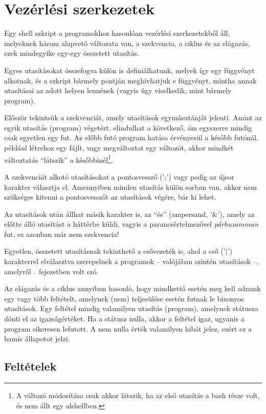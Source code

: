 \chapter{Vezérlési szerkezetek}%
\label{cha:vez-szerk}

Egy shell szkript a programokhoz hasonlóan vezérlési szerkezetekből áll,
melyeknek három alapvető változata van, a szekvencia, a ciklus és az
elágazás, ezek mindegyike egy-egy összetett utasítás.

Egyes utasításokat összefogva külön is definiálhatunk, melyek így egy
függvényt alkotnak, és a szkript bármely pontján meghívhatjuk e függvényt,
mintha annak utasításai az adott helyen lennének (vagyis úgy viselkedik, mint
bármely program).

Először tekintsük a szekvenciát, amely utasítások egymásutánját jelenti. Amint
az egyik utasítás (program) végetért, elindulhat a következő, ám egyszerre
mindig csak egyetlen egy fut. Az előbb futó program hatása érvényesül a később
futónál, például létrehoz egy fájlt, vagy megváltoztat egy változót, akkor
mindkét változtatás ``látszik'' a későbbinél\footnote{A változó módosítása csak
akkor látszik, ha az első utasítás a bash része volt, és nem állt egy
alshellben.}.

A szekvenciát alkotó utasításokat a pontosvessző (';') vagy pedig az újsor
karakter választja el. Amennyiben minden utasítás külön sorban van, akkor nem
szükséges kitenni a pontosvesszőt az utasítások végére, bár ki lehet.

Az utasítások után állhat másik karakter is, az ``és'' (ampersand, '\&'), amely
az előtte álló utasítást a háttérbe küldi, vagyis a parancsértelmezővel
\emph{párhuzamosan} fut, ez azonban már nem szekvencia!

Egyetlen, összetett  utasításnak tekinthető a csővezeték is, ahol a cső ('|')
karakterrel elválasztva szerepelnek a programok -- valójában szintén utasítások
--, amelyről .\ fejezetben volt szó.

Az elágazás és a ciklus annyiban hasonló, hogy mindkettő esetén meg kell adnunk
egy vagy több feltételt, amelynek (nem) teljesülése esetén futnak le bizonyos
utasítások. Egy feltétel mindig valamilyen utasítás (program), amelynek státusza
dönti el az igazságértéket. Ha a státusz nulla, akkor a feltétel igaz, ugyanis a
program sikeresen lefutott. A nem nulla érték valamilyen hibát jelez, ezért ez a
hamis állapotot jelzi.

\section{Feltételek}

